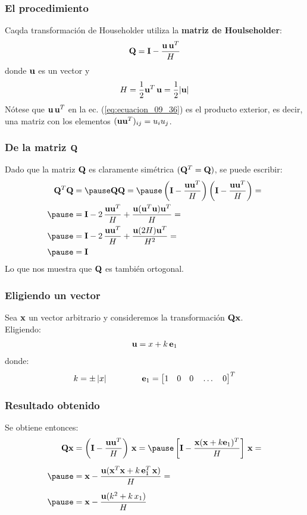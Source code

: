\documentclass[12pt]{beamer}
\begin{document}
\begin{frame}
\frametitle{El procedimiento}
Caqda transformación de Householder utiliza la \textbf{\textcolor{drab}{matriz de Houlseholder}}:
\pause
\begin{align}
\vb{Q} = \vb{I} - \dfrac{\vb{u} \, \vb{u}^{T}}{H}
\label{eq:ecuacion_09_36}
\end{align}
\pause
donde 
$\vb{u}$ es un vector y 
\begin{align}
H = \dfrac{1}{2} \vb{u}^{T} \, \vb{u} = \dfrac{1}{2} \abs{\vb{u}}
\label{eq:ecuacion_09_37}
\end{align}
\pause
Nótese que $\vb{u} \, \vb{u}^{T}$ en la ec. (\ref{eq:ecuacion_09_36}) es el producto exterior, es decir, una matriz con los elementos $(\vb{u} \vb{u}^{T})_{ij} = u_{i} u_{j}$.
\end{frame}
\begin{frame}
\frametitle{De la matriz $\vb{Q}$}
Dado que la matriz $\vb{Q}$ es claramente simétrica $(\vb{Q}^{T} = \vb{Q})$, se puede escribir:
\pause
\begin{eqnarray*}
\begin{aligned}
\vb{Q}^{T} \vb{Q} &= \pause \vb{Q Q} = \pause \left( \vb{I} - \dfrac{\vb{u} \vb{u}^{T}}{H} \right) \left( \vb{I} - \dfrac{\vb{u} \vb{u}^{T}}{H} \right) = \\ \pause
&= \vb{I} - 2 \, \dfrac{\vb{u} \vb{u}^{T}}{H} + \dfrac{\vb{u} (\vb{u}^{T} \vb{u}) \vb{u}^{T}}{H} = \\ \pause
&= \vb{I} - 2 \, \dfrac{\vb{u} \vb{u}^{T}}{H} + \dfrac{\vb{u} (2 H) \vb{u}^{T}}{H^{2}} = \\ \pause
&= \vb{I}
\end{aligned}
\end{eqnarray*}
Lo que nos muestra que $\vb{Q}$ es también ortogonal.
\end{frame}
\begin{frame}
\frametitle{Eligiendo un vector}
Sea $\vb{x}$ un vector arbitrario y consideremos la transformación $\vb{Q x}$.
\\
\bigskip
\pause
Eligiendo:
\pause
\begin{align}
\vb{u} = x + k \, \vb{e}_{1}
\label{eq:ecuacion_09_38}
\end{align}
\pause
donde:
\begin{align*}
k = \pm \, \abs{x} \hspace{1.5cm} \vb{e}_{1} = \big[ 1 \quad 0 \quad 0 \quad \ldots \quad 0 \big]^{T}
\end{align*}
\end{frame}
\begin{frame}
\frametitle{Resultado obtenido}
Se obtiene entonces:
\pause
\begin{eqnarray*}
\begin{aligned}
\vb{Q x} &= \left( \vb{I} - \dfrac{\vb{u} \vb{u}^{T}}{H} \right) \, \vb{x} = \pause \left[ \vb{I} - \dfrac{\vb{x} (\vb{x} + k \vb{e}_{1})^{T}}{H} \right] \, \vb{x} = \\[0.5em] \pause
&= \vb{x} - \dfrac{\vb{u} (\vb{x}^{T} \vb{x} + k \, \vb{e}_{1}^{T} \, \vb{x})}{H} = \\[0.5em] \pause
&= \vb{x} - \dfrac{\vb{u} (k^{2} + k \,x_{1})}{H}
\end{aligned}
\end{eqnarray*}
\end{frame}
\end{document}

